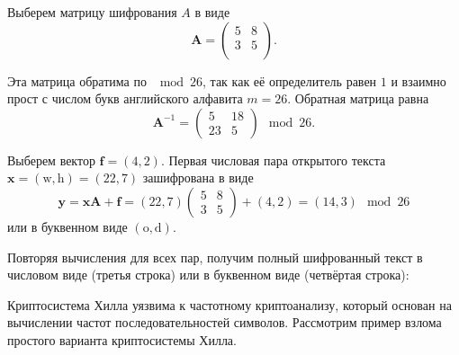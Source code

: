 Выберем матрицу шифрования $A$ в виде
\[
    \mathbf{A} = \left( \begin{array}{cc}
        5 & 8 \\
        3 & 5 \\
    \end{array} \right).
\]

Эта матрица обратима по $\mod 26$, так как её определитель равен $1$ и взаимно прост с числом букв английского алфавита $m=26$. Обратная матрица равна
\[
    \mathbf{A}^{-1} = \left( \begin{array}{cc}
        5  & 18 \\
        23 & 5
    \end{array} \right) \mod 26.
\]

Выберем вектор $\mathbf{f} = (4, 2)$. Первая числовая пара открытого текста  $\mathbf{x} = (\text{w}, \text{h}) = (22, 7)$  зашифрована в виде
\[
    \mathbf{y} = \mathbf{x} \mathbf{A} + \mathbf{f} =
        (22, 7)
        \left( \begin{array}{cc}
            5 & 8 \\
            3 & 5
        \end{array} \right) +
        (4, 2) = (14, 3) \mod 26
\]
или в буквенном виде  $(\text{o}, \text{d})$.

Повторяя вычисления для всех пар, получим полный шифрованный текст в числовом виде (третья строка) или в буквенном виде (четвёртая строка):
\begin{center}  \end{center}
\exampleend

Криптосистема Хилла уязвима к частотному криптоанализу, который основан на вычислении частот последовательностей символов. Рассмотрим пример взлома простого варианта криптосистемы Хилла.

